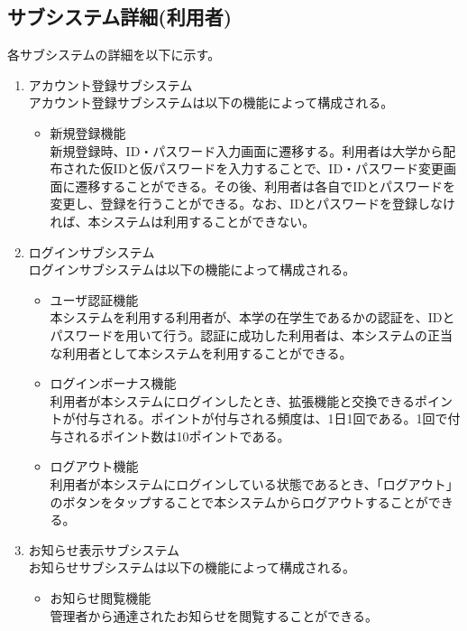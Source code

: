 \documentclass[a4j]{jarticle}
\begin{document}
\subsection{サブシステム詳細(利用者)}
各サブシステムの詳細を以下に示す。
\begin{enumerate}
  \item アカウント登録サブシステム\\
  アカウント登録サブシステムは以下の機能によって構成される。
  \begin{itemize}
    \item 新規登録機能\\
    新規登録時、ID・パスワード入力画面に遷移する。利用者は大学から配布された仮IDと仮パスワードを入力することで、ID・パスワード変更画面に遷移することができる。その後、利用者は各自でIDとパスワードを変更し、登録を行うことができる。なお、IDとパスワードを登録しなければ、本システムは利用することができない。
  \end{itemize}

  \item ログインサブシステム\\
  ログインサブシステムは以下の機能によって構成される。
  \begin{itemize}
    \item ユーザ認証機能\\
    本システムを利用する利用者が、本学の在学生であるかの認証を、IDとパスワードを用いて行う。認証に成功した利用者は、本システムの正当な利用者として本システムを利用することができる。
    \item ログインボーナス機能\\
    利用者が本システムにログインしたとき、拡張機能と交換できるポイントが付与される。ポイントが付与される頻度は、1日1回である。1回で付与されるポイント数は10ポイントである。
    \item ログアウト機能\\
    利用者が本システムにログインしている状態であるとき、「ログアウト」のボタンをタップすることで本システムからログアウトすることができる。
  \end{itemize}

  \item お知らせ表示サブシステム\\
  お知らせサブシステムは以下の機能によって構成される。
  \begin{itemize}
    \item お知らせ閲覧機能\\
    管理者から通達されたお知らせを閲覧することができる。
  \end{itemize}


\end{enumerate}
\end{document}
